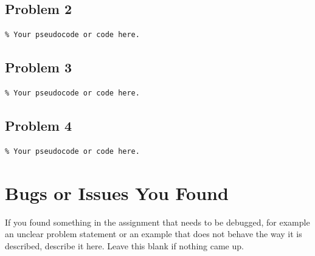 \documentclass[11pt]{article}
\begin{document}
\subsection{Problem 2}
\begin{lstlisting}
% Your pseudocode or code here.
\end{lstlisting}

\subsection{Problem 3}
\begin{lstlisting}
% Your pseudocode or code here.
\end{lstlisting}

\subsection{Problem 4}
\begin{lstlisting}
% Your pseudocode or code here.
\end{lstlisting}

\section{Bugs or Issues You Found}
If you found something in the assignment that needs to be debugged, for
example an unclear problem statement or an example that does not behave
the way it is described, describe it here. Leave this blank if nothing
came up.

\vspace{3em}
\end{document}
